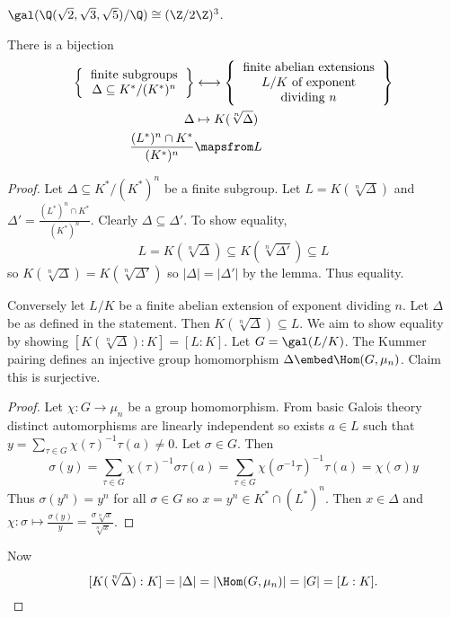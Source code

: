 \documentclass[a4paper]{article}
\theoremstyle{definition}
\theoremstyle{theorem}
\begin{document}
\begin{eg}
  \(\gal(\Q(\sqrt 2, \sqrt 3, \sqrt 5)/\Q) \cong (\Z/2\Z)^3\).
\end{eg}

\begin{theorem}
  There is a bijection
  \begin{align*}
    \left\{
    \begin{tabular}{c}
      finite subgroups \\
      \(\Delta \subseteq K^*/(K^*)^n\)
    \end{tabular}
    \right\}
    &\longleftrightarrow
      \left\{
      \begin{tabular}{c}
        finite abelian extensions \\
        \(L/K\) of exponent \\
        dividing \(n\)
      \end{tabular}
    \right\} \\
    \Delta &\mapsto K(\sqrt[n] \Delta) \\
    \frac{(L^*)^n \cap K^*}{(K^*)^n} &\mapsfrom L
  \end{align*}
\end{theorem}

\begin{proof}
  Let \(\Delta \subseteq K^*/(K^*)^n\) be a finite subgroup. Let \(L = K(\sqrt[n]\Delta)\) and \(\Delta' = \frac{(L^*)^n \cap K^*}{(K^*)^n}\). Clearly \(\Delta \subseteq \Delta'\). To show equality,
  \[
    L = K(\sqrt[n]\Delta) \subseteq K(\sqrt[n]{\Delta'}) \subseteq L
  \]
  so \(K(\sqrt[n]\Delta) = K(\sqrt[n]{\Delta'})\) so \(|\Delta| = |\Delta'|\) by the lemma. Thus equality.

  Conversely let \(L/K\) be a finite abelian extension of exponent dividing \(n\). Let \(\Delta\) be as defined in the statement. Then \(K(\sqrt[n]{\Delta}) \subseteq L\). We aim to show equality by showing \([K(\sqrt[n]{\Delta}) : K] = [L : K]\). Let \(G = \gal(L/K)\). The Kummer pairing defines an injective group homomorphism \(\Delta \embed \Hom(G, \mu_n)\). Claim this is surjective.

  \begin{proof}
    Let \(\chi: G \to \mu_n\) be a group homomorphism. From basic Galois theory distinct automorphisms are linearly independent so exists \(a \in L\) such that \(y = \sum_{\tau \in G} \chi(\tau)^{-1} \tau(a) \neq 0\). Let \(\sigma \in G\). Then
    \[
      \sigma(y)
      = \sum_{\tau \in G} \chi(\tau)^{-1} \sigma \tau(a)
      = \sum_{\tau \in G} \chi(\sigma^{-1} \tau)^{-1} \tau(a)
      = \chi(\sigma) y
    \]
    Thus \(\sigma(y^n) = y^n\) for all \(\sigma \in G\) so \(x = y^n \in K^* \cap (L^*)^n\). Then \(x \in \Delta\) and \(\chi: \sigma \mapsto \frac{\sigma(y)}{y} = \frac{\sigma \sqrt[n]{x}}{\sqrt[n]{x}}\).
  \end{proof}

  Now
  \[
    [K(\sqrt[n]{\Delta}) : K] = |\Delta| = |\Hom(G, \mu_n)| = |G| = [L : K].
  \]
\end{proof}
\end{document}
